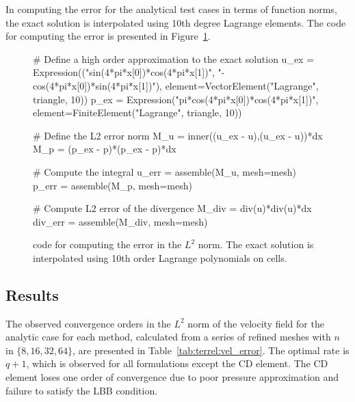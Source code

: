 In computing the error for the analytical test cases in terms of
function norms, the exact solution is interpolated using 10th degree
Lagrange elements. The code for computing the error is presented in
Figure~\ref{code:terrel:error}.

\begin{figure}
\begin{python}
# Define a high order approximation to the exact solution
u_ex = Expression(("sin(4*pi*x[0])*cos(4*pi*x[1])",
               "-cos(4*pi*x[0])*sin(4*pi*x[1])"),
               element=VectorElement("Lagrange", triangle, 10))
p_ex = Expression("pi*cos(4*pi*x[0])*cos(4*pi*x[1])",
               element=FiniteElement("Lagrange", triangle, 10))

# Define the L2 error norm
M_u = inner((u_ex - u),(u_ex - u))*dx
M_p = (p_ex - p)*(p_ex - p)*dx

# Compute the integral
u_err = assemble(M_u, mesh=mesh)
p_err = assemble(M_p, mesh=mesh)

# Compute L2 error of the divergence
M_div = div(u)*div(u)*dx
div_err = assemble(M_div, mesh=mesh)
\end{python}
\label{code:terrel:error}
\caption{\dolfin{} code for computing the error in the $L^{2}$ norm. The
exact solution is interpolated using 10th order Lagrange polynomials
on cells.}
\end{figure}
\subsection{Results}

The observed convergence orders in the $L^{2}$ norm of the velocity
field for the analytic case for each method, calculated from a series
of refined meshes with $n$ in $\{8, 16, 32, 64\}$, are presented in
Table~\ref{tab:terrel:vel_error}. The optimal rate is $q + 1$, which is
observed for all formulations except the CD element.  The CD element
loses one order of convergence due to poor pressure approximation and
failure to satisfy the LBB condition.

